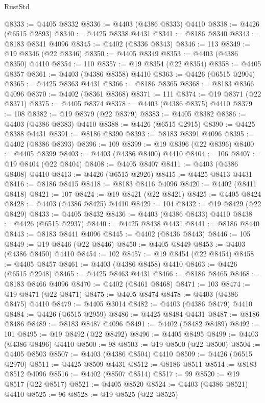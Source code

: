 \begin{lexlean}{RustStd}
\begin{coremodule}
@8333 := @4405 @8332
@8336 := @4403 (@4386 @8333) @4410
@8338 := @4426 (@6515 @2893)
@8340 := @4425 @8338 @4431
@8341 := @8186 @8340
@8343 := @8183 @8341 @4096
@8345 := @4402 (@8336 @8343)
@8346 := 113
@8349 := @19 @8346 (@22 @8346)
@8350 := @4405 @8349
@8353 := @4403 (@4386 @8350) @4410
@8354 := 110
@8357 := @19 @8354 (@22 @8354)
@8358 := @4405 @8357
@8361 := @4403 (@4386 @8358) @4410
@8363 := @4426 (@6515 @2904)
@8365 := @4425 @8363 @4431
@8366 := @8186 @8365
@8368 := @8183 @8366 @4096
@8370 := @4402 (@8361 @8368)
@8371 := 111
@8374 := @19 @8371 (@22 @8371)
@8375 := @4405 @8374
@8378 := @4403 (@4386 @8375) @4410
@8379 := 108
@8382 := @19 @8379 (@22 @8379)
@8383 := @4405 @8382
@8386 := @4403 (@4386 @8383) @4410
@8388 := @4426 (@6515 @2915)
@8390 := @4425 @8388 @4431
@8391 := @8186 @8390
@8393 := @8183 @8391 @4096
@8395 := @4402 (@8386 @8393)
@8396 := 109
@8399 := @19 @8396 (@22 @8396)
@8400 := @4405 @8399
@8403 := @4403 (@4386 @8400) @4410
@8404 := 106
@8407 := @19 @8404 (@22 @8404)
@8408 := @4405 @8407
@8411 := @4403 (@4386 @8408) @4410
@8413 := @4426 (@6515 @2926)
@8415 := @4425 @8413 @4431
@8416 := @8186 @8415
@8418 := @8183 @8416 @4096
@8420 := @4402 (@8411 @8418)
@8421 := 107
@8424 := @19 @8421 (@22 @8421)
@8425 := @4405 @8424
@8428 := @4403 (@4386 @8425) @4410
@8429 := 104
@8432 := @19 @8429 (@22 @8429)
@8433 := @4405 @8432
@8436 := @4403 (@4386 @8433) @4410
@8438 := @4426 (@6515 @2937)
@8440 := @4425 @8438 @4431
@8441 := @8186 @8440
@8443 := @8183 @8441 @4096
@8445 := @4402 (@8436 @8443)
@8446 := 105
@8449 := @19 @8446 (@22 @8446)
@8450 := @4405 @8449
@8453 := @4403 (@4386 @8450) @4410
@8454 := 102
@8457 := @19 @8454 (@22 @8454)
@8458 := @4405 @8457
@8461 := @4403 (@4386 @8458) @4410
@8463 := @4426 (@6515 @2948)
@8465 := @4425 @8463 @4431
@8466 := @8186 @8465
@8468 := @8183 @8466 @4096
@8470 := @4402 (@8461 @8468)
@8471 := 103
@8474 := @19 @8471 (@22 @8471)
@8475 := @4405 @8474
@8478 := @4403 (@4386 @8475) @4410
@8479 := @4405 @3014
@8482 := @4403 (@4386 @8479) @4410
@8484 := @4426 (@6515 @2959)
@8486 := @4425 @8484 @4431
@8487 := @8186 @8486
@8489 := @8183 @8487 @4096
@8491 := @4402 (@8482 @8489)
@8492 := 101
@8495 := @19 @8492 (@22 @8492)
@8496 := @4405 @8495
@8499 := @4403 (@4386 @8496) @4410
@8500 := 98
@8503 := @19 @8500 (@22 @8500)
@8504 := @4405 @8503
@8507 := @4403 (@4386 @8504) @4410
@8509 := @4426 (@6515 @2970)
@8511 := @4425 @8509 @4431
@8512 := @8186 @8511
@8514 := @8183 @8512 @4096
@8516 := @4402 (@8507 @8514)
@8517 := 99
@8520 := @19 @8517 (@22 @8517)
@8521 := @4405 @8520
@8524 := @4403 (@4386 @8521) @4410
@8525 := 96
@8528 := @19 @8525 (@22 @8525)

\end{coremodule}
\end{lexlean}
